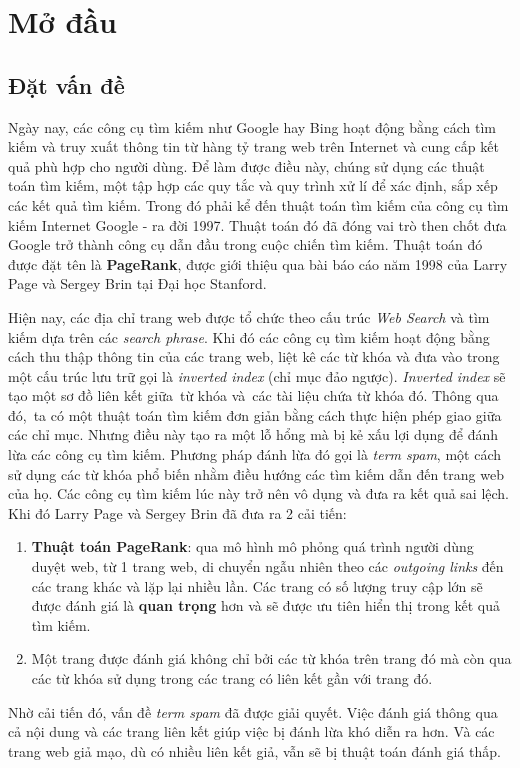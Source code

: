 \chapter{Mở đầu}
\section{Đặt vấn đề}
  Ngày nay, các công cụ tìm kiếm như Google hay Bing hoạt động bằng cách tìm kiếm và truy xuất thông tin từ hàng tỷ trang web trên Internet và cung cấp kết quả phù hợp cho người dùng. Để làm được điều này, chúng sử dụng các thuật toán tìm kiếm, một tập hợp các quy tắc và quy trình xử lí để xác định, sắp xếp các kết quả tìm kiếm. Trong đó phải kể đến thuật toán tìm kiếm của công cụ tìm kiếm Internet Google - ra đời 1997. Thuật toán đó đã đóng vai trò then chốt đưa Google trở thành công cụ dẫn đầu trong cuộc chiến tìm kiếm. Thuật toán đó được đặt tên là \textbf{PageRank}, được giới thiệu qua bài báo cáo năm 1998 của Larry Page và Sergey Brin tại Đại học Stanford. 
  
  Hiện nay, các địa chỉ trang web được tổ chức theo cấu trúc \emph{Web Search} và tìm kiếm dựa trên các \emph{search phrase}. Khi đó các công cụ tìm kiếm hoạt động bằng cách thu thập thông tin của các trang web, liệt kê các từ khóa và đưa vào trong một cấu trúc lưu trữ gọi là \emph{inverted index} (chỉ mục đảo ngược)\cite{Leskovec_Rajaraman_Ullman_2022}. \emph{Inverted index} sẽ tạo một sơ đồ liên kết giữa từ khóa và các tài liệu chứa từ khóa đó. Thông qua đó, ta có một thuật toán tìm kiếm đơn giản bằng cách thực hiện phép giao giữa các chỉ mục. Nhưng điều này tạo ra một lỗ hổng mà bị kẻ xấu lợi dụng để đánh lừa các công cụ tìm kiếm. Phương pháp đánh lừa đó gọi là \emph{term spam}, một cách sử dụng các từ khóa phổ biến nhằm điều hướng các tìm kiếm dẫn đến trang web của họ. Các công cụ tìm kiếm lúc này trở nên vô dụng và đưa ra kết quả sai lệch. Khi đó Larry Page và Sergey Brin đã đưa ra 2 cải tiến:
  \begin{enumerate}    
    \item \textbf{Thuật toán PageRank}: qua mô hình mô phỏng quá trình người dùng duyệt web, từ 1 trang web, di chuyển ngẫu nhiên theo các \emph{outgoing links} đến các trang khác và lặp lại nhiều lần. Các trang có số lượng truy cập lớn sẽ được đánh giá là \textbf{quan trọng} hơn và sẽ được ưu tiên hiển thị trong kết quả tìm kiếm.\cite{Leskovec_Rajaraman_Ullman_2022}
    \item Một trang được đánh giá không chỉ bởi các từ khóa trên trang đó mà còn qua các từ khóa sử dụng trong các trang có liên kết gần với trang đó.\cite{Leskovec_Rajaraman_Ullman_2022}
  \end{enumerate}
  Nhờ cải tiến đó, vấn đề \emph{term spam} đã được giải quyết. Việc đánh giá thông qua cả nội dung và các trang liên kết giúp việc bị đánh lừa khó diễn ra hơn. Và các trang web giả mạo, dù có nhiều liên kết giả, vẫn sẽ bị thuật toán đánh giá thấp.
  
